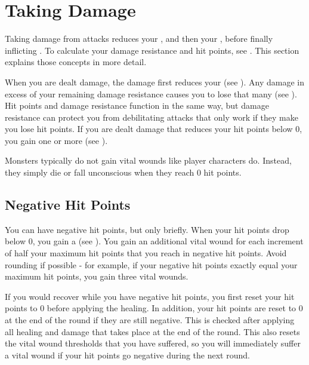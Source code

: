 \section{Taking Damage}\label{Taking Damage}
    Taking damage from attacks reduces your , and then your , before finally inflicting .
    To calculate your damage resistance and hit points, see .
    This section explains those concepts in more detail.

    When you are dealt damage, the damage first reduces your  (see ).
    Any damage in excess of your remaining damage resistance causes you to lose that many  (see ).
    Hit points and damage resistance function in the same way, but damage resistance can protect you from debilitating attacks that only work if they make you lose hit points.
    If you are dealt damage that reduces your hit points below 0, you gain one or more  (see ).

    Monsters typically do not gain vital wounds like player characters do.
    Instead, they simply die or fall unconscious when they reach 0 hit points.

    \subsection{Negative Hit Points}\label{Negative Hit Points}
        You can have negative hit points, but only briefly.
        When your hit points drop below 0, you gain a  (see ).
        You gain an additional vital wound for each increment of half your maximum hit points that you reach in negative hit points.
        Avoid rounding if possible - for example, if your negative hit points exactly equal your maximum hit points, you gain three vital wounds.

        If you would recover  while you have negative hit points, you first reset your hit points to 0 before applying the healing.
        In addition, your hit points are reset to 0 at the end of the round if they are still negative.
        This is checked after applying all healing and damage that takes place at the end of the round.
        This also resets the vital wound thresholds that you have suffered, so you will immediately suffer a vital wound if your hit points go negative during the next round.

